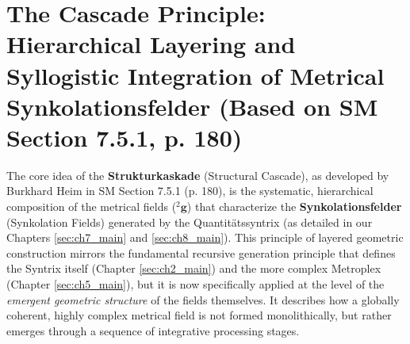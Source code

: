 \documentclass[
    12pt,              %
    a4paper,           %
    headings=normal,   %
    twoside=true,      %
    BCOR=8mm,          %
]{scrbook}
\newcommand{\kompositionsfeld}{{}^2\mathbf{g}}
\begin{document}
\section{The Cascade Principle: Hierarchical Layering and Syllogistic Integration of Metrical Synkolationsfelder (Based on SM Section 7.5.1, p. 180)}
\label{sec:ch9_1_cascade_principle}

The core idea of the \textbf{Strukturkaskade} (Structural Cascade), as developed by Burkhard Heim in SM Section 7.5.1 (p. 180), is the systematic, hierarchical composition of the metrical fields (\(\kompositionsfeld\)) that characterize the \textbf{Synkolationsfelder} (Synkolation Fields) generated by the Quantitätssyntrix (as detailed in our Chapters \ref{sec:ch7_main} and \ref{sec:ch8_main}). This principle of layered geometric construction mirrors the fundamental recursive generation principle that defines the Syntrix itself (Chapter \ref{sec:ch2_main}) and the more complex Metroplex (Chapter \ref{sec:ch5_main}), but it is now specifically applied at the level of the \textit{emergent geometric structure} of the fields themselves. It describes how a globally coherent, highly complex metrical field is not formed monolithically, but rather emerges through a sequence of integrative processing stages.
\end{document}
